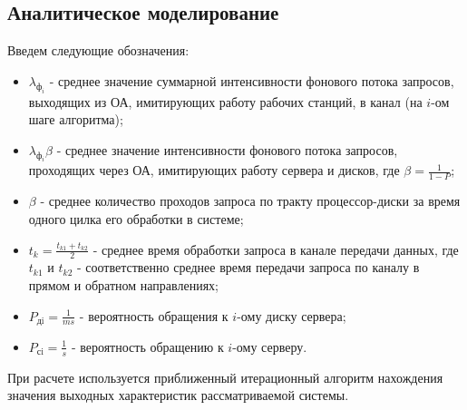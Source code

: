\documentclass[russian,utf8,emptystyle]{eskdtext}
\begin{document}
\subsection{Аналитическое моделирование}
Введем следующие обозначения:
\begin{itemize}[label=-]
\item $\lambda_{\text{ф}_i}$ - среднее значение суммарной интенсивности фонового потока запросов, выходящих из ОА, имитирующих работу рабочих станций, в канал (на $i$-ом шаге алгоритма);
\item $\lambda_{\text{ф}_i} \beta$ - среднее значение интенсивности фонового потока запросов, проходящих через ОА, имитирующих работу сервера и дисков, где $\beta = \frac{1}{1-P}$;
\item $\beta$ - среднее количество проходов запроса по тракту процессор-диски за время одного цилка его обработки в системе;
\item $t_k = \frac{t_{k1} + t_{k2}}{2}$ - среднее время обработки запроса в канале передачи данных, где $t_{k1}$ и $t_{k2}$ - соответственно среднее время передачи запроса по каналу в прямом и обратном направлениях;
\item $P_\text{дi} = \frac{1}{m s}$ - вероятность обращения к $i$-ому диску сервера;
\item $P_\text{сi} = \frac{1}{s}$ - вероятность обращению к $i$-ому серверу.
\end{itemize}

При расчете используется приближенный итерационный алгоритм нахождения значения выходных характеристик рассматриваемой системы.
\end{document}
